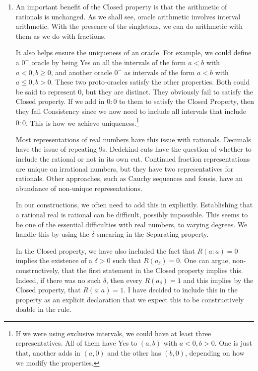 \documentclass[12pt]{article}
\begin{document}
\begin{enumerate}
    \item An important benefit of the Closed property is that the arithmetic of rationals is unchanged. As we shall see, oracle arithmetic involves interval arithmetic. With the presence of the singletons, we can do arithmetic with them as we do with fractions. 
    
    It also helps ensure the uniqueness of an oracle. For example, we could define a $0^+$ oracle by being Yes on all the intervals of the form $a \lt b$ with $a < 0, b \geq 0$, and another oracle $0^-$ as intervals of the form $a \lt b$ with $a \leq 0, b >0$. These two proto-oracles satisfy the other properties. Both could be said to represent $0$, but they are distinct. They obviously fail to satisfy the Closed property. If we add in $0:0$ to them to satisfy the Closed Property, then they fail Consistency since we now need to include all intervals that include $0:0$. This is how we achieve uniqueness.\footnote{If we were using exclusive intervals, we could have at least three representatives. All of them have Yes to $(a,b)$ with $a<0, b> 0$. One is just that, another adds in $(a, 0)$ and the other has $(b, 0)$, depending on how we modify the properties.} 
    
    Most representations of real numbers have this issue with rationals. Decimals have the issue of repeating 9s. Dedekind cuts have the question of whether to include the rational or not in its own cut. Continued fraction representations are unique on irrational numbers, but they have two representatives for rationals. Other approaches, such as Cauchy sequences and fonsis, have an abundance of non-unique representations. 
    
    In our constructions, we often need to add this in explicitly. Establishing that a rational real is rational can be difficult, possibly impossible. This seems to be one of the essential difficulties with real numbers, to varying degrees. We handle this by using the $\delta$ smearing in the Separating property. 

    In the Closed property, we have also included the fact that $R(a:a)=0$ implies the existence of a $\delta > 0$ such that $R(a_\delta) = 0$. One can argue, non-constructively, that the first statement in the Closed property implies this. Indeed, if there was no such $\delta$, then every $R(a_\delta)=1$ and this implies by the Closed property, that $R(a:a)=1$. I have decided to include this in the property as an explicit declaration that we expect this to be constructively doable in the rule.  

\end{enumerate}
\end{document}
